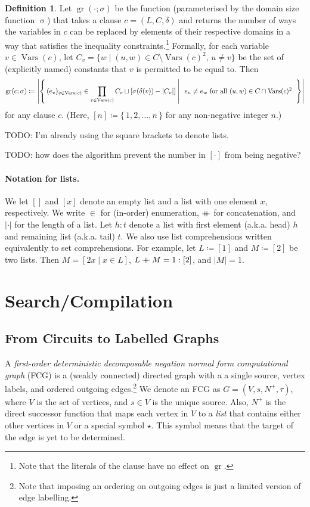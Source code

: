 \documentclass{article}
\theoremstyle{definition}
\newtheorem{definition}{Definition}
\theoremstyle{remark}
\newcommand\mdoubleplus{\mathbin{+\mkern-10mu+}}
\DeclareMathOperator{\size}{\sigma}
\DeclareMathOperator{\Vars}{Vars}
\DeclareMathOperator{\gr}{gr}
\begin{document}
\begin{definition}
  Let $\gr(\cdot; \sigma)$ be the function (parameterised by the domain size function $\size$) that takes a clause $c = (L, C, \delta)$ and returns the number of ways the variables in $c$ can be replaced by elements of their respective domains in a way that satisfies the inequality constraints.\footnote{Note that the literals of the clause have no effect on $\gr$.} Formally, for each variable $v \in \Vars(c)$, let $C_v = \{ w \mid (u, w) \in C \setminus \Vars(c)^2 \text{, }u \ne v \}$ be the set of (explicitly named) constants that $v$ is permitted to be equal to. Then
  \[
  \gr(c; \sigma) \coloneqq \left|\left\{\, (e_v)_{v \in \Vars(c)} \in \prod_{v \in \Vars(c)} C_v \sqcup [\sigma(\delta(v)) - |C_v|] \;\middle|\; \right.\right. e_u \ne e_w \text{ for all } (u, w) \in C \cap \Vars(c)^2 \left.\left. \vphantom{\prod_{v \in \Vars(c)}} \,\right\}\right|
  \]
  for any clause $c$. (Here, $[n] \coloneqq \{\,1, 2, \dots, n\,\}$ for any non-negative integer $n$.)
\end{definition}

TODO: I'm already using the square brackets to denote lists.

TODO: how does the algorithm prevent the number in $[\cdot]$ from being negative?

\paragraph{Notation for lists.}
We let $[]$ and $[x]$ denote an empty list and a list with one element $x$, respectively. We write $\in$ for (in-order) enumeration, $\mdoubleplus$ for concatenation, and $|\cdot|$ for the length of a list. Let $h : t$ denote a list with first element (a.k.a. head) $h$ and remaining list (a.k.a. tail) $t$. We also use list comprehensions written equivalently to set comprehensions. For example, let $L \coloneqq [1]$ and $M \coloneqq [2]$ be two lists. Then $M = [2x \mid x \in L]$, $L \mdoubleplus M = 1 : [2]$, and $|M| = 1$.

\section{Search/Compilation}

\subsection{From Circuits to Labelled Graphs}

A \emph{first-order deterministic decomposable negation normal form computational graph} (FCG) is a (weakly connected) directed graph with a a single source, vertex labels, and ordered outgoing edges.\footnote{Note that imposing an ordering on outgoing edges is just a limited version of edge labelling.} We denote an FCG as $G = (V, s, N^+, \tau)$, where $V$ is the set of vertices, and $s \in V$ is the unique source. Also, $N^+$ is the direct successor function that maps each vertex in $V$ to a \emph{list} that contains either other vertices in $V$ or a special symbol $\star$. This symbol means that the target of the edge is yet to be determined.
\end{document}
